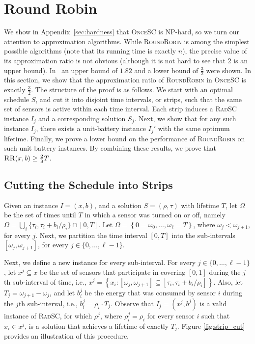 \documentclass[11pt]{article}
\newcommand{\set}[1]{\left\{ #1 \right\}}
\newcommand{\threehalves}{\frac{3}{2}}
\newcommand{\sosc}{\textsc{OnceSC}\xspace}
\newcommand{\srsc}{\textsc{RadSC}\xspace}
\newcommand{\rr}{\textsc{RoundRobin}\xspace}
\newcommand{\RR}{\textsc{RR}\xspace}
\begin{document}
\section{Round Robin}
\label{sec:rr}

We show in Appendix~\ref{sec:hardness} that \sosc is NP-hard, so 
we turn our attention to approximation algorithms.  While \rr is among
the simplest possible algorithms (note that its running time is
exactly $n$), the precise value of its approximation ratio is not
obvious (although it is not hard to see that $2$ is an upper bound).
In~\cite{barnoy2011maximizing} an upper bound of $1.82$ and a lower
bound of $\threehalves$ were shown.
In this section, we show that the approximation ratio of \rr in \sosc
is exactly $\threehalves$.
The structure of the proof is as follows.  We start with an optimal
schedule $S$, and cut it into disjoint time intervals, or strips, such
that the same set of sensors is active within each time interval.
Each strip induces a \srsc instance $I_j$ and a corresponding solution
$S_j$.
Next, we show that for any such instance $I_j$, there exists a
unit-battery instance $I_j'$ with the same optimum lifetime. Finally,
we prove a lower bound on the performance of \rr on such unit battery
instances. By combining these results, we prove that $\RR(x,b) \geq
\frac{2}{3} T$.






\subsection{Cutting the Schedule into Strips}

Given an instance $I = (x,b)$, and a solution $S = (\rho,\tau)$ with
lifetime $T$, let $\Omega$ be the set of times until $T$ in which a
sensor was turned on or off, namely
\(
\Omega = \bigcup_i \{\tau_i,\tau_i+b_i/\rho_i\} \cap [0,T]
\).
Let $\Omega = \set{0=\omega_0,\ldots,\omega_\ell = T}$, where $\omega_j <
\omega_{j+1}$, for every $j$. 
Next, we partition the time interval $[0,T]$ into the sub-intervals
$[\omega_j,\omega_{j+1}]$, for every $j \in \{0,\ldots,\ell-1\}$.  

Next, we define a new instance for every sub-interval.  For every $j
\in \{0,\ldots,\ell-1\}$, let $x^j \subseteq x$ be the set of sensors
that participate in covering $[0,1]$ during the $j$th sub-interval of
time, i.e.,
\(
x^j = 
\set{x_i : [\omega_j,\omega_{j+1}] \subseteq [\tau_i, \tau_i+b_i/ \rho_i] }
\).
Also, let $T_j = \omega_{j+1} - \omega_j$, and let $b^j_i$ be the
energy that was consumed by sensor $i$ during the $j$th sub-interval,
i.e., $b^j_i = \rho_i \cdot T_j$.  Observe that $I_j = (x^j,b^j)$ is a
valid instance of \srsc, for which $\rho^j$, where $\rho^j_i =
\rho_i$ for every sensor $i$ such that $x_i \in x^j$, is a solution
that achieves a lifetime of exactly $T_j$.
Figure \ref{fig:strip_cut} 
provides an illustration of this procedure.
\end{document}
